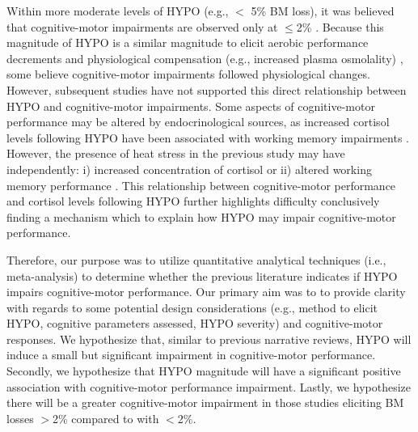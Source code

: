 Within more moderate levels of HYPO (e.g., $<$ 5\% BM loss), it was believed that cognitive-motor impairments are observed only at ${\leq}$2\% \cite{gopinathan_role_1988,sharma_influence_1986,sharma_differential_1983}. Because this magnitude of HYPO is a similar magnitude to elicit aerobic performance decrements \cite{sawka_hypohydration_2015} and physiological compensation (e.g., increased plasma osmolality) \cite{cheuvront_dehydration:_2014}, some believe cognitive-motor impairments followed physiological changes. However, subsequent studies have not supported this direct relationship between HYPO and cognitive-motor impairments. Some aspects of cognitive-motor performance may be altered by endocrinological sources, as increased cortisol levels following HYPO have been associated with working memory impairments \cite{mcmorris_heat_2006}. However, the presence of heat stress in the previous study may have independently: i) increased concentration of cortisol  or ii) altered  working memory performance \cite{hancock_effects_2003}. This relationship between cognitive-motor performance and cortisol levels following HYPO further highlights difficulty conclusively finding a mechanism which to explain how HYPO may impair cognitive-motor performance.

Therefore, our purpose was to utilize quantitative analytical techniques (i.e., meta-analysis) to determine whether the previous literature indicates if HYPO impairs cognitive-motor performance. Our primary aim was to to provide clarity with regards to some potential design considerations (e.g., method to elicit HYPO, cognitive parameters assessed, HYPO severity) and cognitive-motor responses. We hypothesize that, similar to previous narrative reviews, HYPO will induce a small but significant impairment in cognitive-motor performance. Secondly, we hypothesize that HYPO magnitude will have a significant positive association with cognitive-motor performance impairment. Lastly, we hypothesize there will be a greater cognitive-motor impairment in those studies eliciting BM losses $>$2\% compared to with $<$2\%.
 
